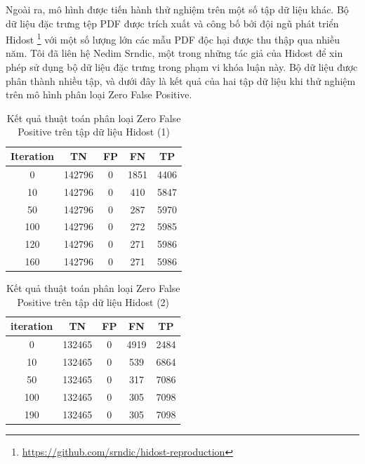 \documentclass[./../main.tex]{subfiles}
\begin{document}
Ngoài ra, mô hình được tiến hành thử nghiệm trên một số tập dữ liệu khác. Bộ dữ liệu đặc trưng tệp PDF được trích xuất và công bố bởi đội ngũ phát triển Hidost \footnote{\url{https://github.com/srndic/hidost-reproduction}} với một số lượng lớn các mẫu PDF độc hại được thu thập qua nhiều năm. Tôi đã liên hệ Nedim Srndic, một trong những tác giả của Hidost \cite{hidost} để xin phép sử dụng bộ dữ liệu đặc trưng trong phạm vi khóa luận này. Bộ dữ liệu được phân thành nhiều tập, và dưới đây là kết quả của hai tập dữ liệu khi thử nghiệm trên mô hình phân loại Zero False Positive.

\begin{table}[]
	\centering
	\caption{Kết quả thuật toán phân loại Zero False Positive trên tập dữ liệu Hidost (1)}
	\label{tab:ket_qua_thuat_toan_phan_loai_hidost}
	\begin{tabular}{|c|c|c|c|c|}
		\hline
		\textbf{Iteration} & \textbf{TN} & \textbf{FP} & \textbf{FN} & \textbf{TP} \\ \hline
		0                  & 142796      & 0           & 1851        & 4406        \\ \hline
		10                 & 142796      & 0           & 410         & 5847        \\ \hline
		50                 & 142796      & 0           & 287         & 5970        \\ \hline
		100                & 142796      & 0           & 272         & 5985        \\ \hline
		120                & 142796      & 0           & 271         & 5986        \\ \hline
		160                & 142796      & 0           & 271         & 5986        \\ \hline
	\end{tabular}
\end{table}

\begin{table}[]
	\centering
	\caption{Kết quả thuật toán phân loại Zero False Positive trên tập dữ liệu Hidost (2)}
	\label{tab:ket_qua_thuat_toan_phan_loai_hidost_2}
	\begin{tabular}{|c|c|c|c|c|}
		\hline
		\textbf{iteration} & \textbf{TN} & \textbf{FP} & \textbf{FN} & \textbf{TP} \\ \hline
		0                  & 132465      & 0           & 4919        & 2484        \\ \hline
		10                 & 132465      & 0           & 539         & 6864        \\ \hline
		50                 & 132465      & 0           & 317         & 7086        \\ \hline
		100                & 132465      & 0           & 305         & 7098        \\ \hline
		190                & 132465      & 0           & 305         & 7098        \\ \hline
	\end{tabular}
\end{table}
\end{document}
